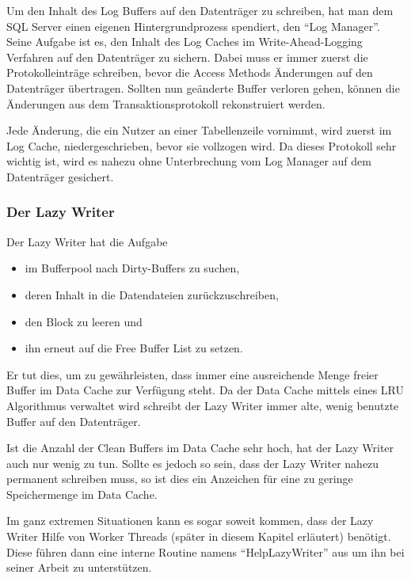           Um den Inhalt des Log Buffers auf den Datenträger zu schreiben, hat
          man dem SQL Server einen eigenen Hintergrundprozess spendiert, den
          \enquote{Log Manager}. Seine Aufgabe ist es, den Inhalt des Log Caches
          im Write-Ahead-Logging Verfahren auf den Datenträger zu sichern.
          Dabei muss er  immer zuerst die Protokolleinträge schreiben, bevor
          die Access Methods Änderungen auf den Datenträger übertragen.
          Sollten nun geänderte Buffer verloren gehen, können die Änderungen aus
          dem Transaktionsprotokoll rekonstruiert werden.
          \begin{merke}
            Jede Änderung, die ein Nutzer an einer Tabellenzeile vornimmt, wird
            zuerst im Log Cache, niedergeschrieben, bevor sie vollzogen wird. Da
            dieses Protokoll sehr wichtig ist, wird es nahezu ohne Unterbrechung
            vom Log Manager auf dem Datenträger gesichert.
          \end{merke}             
        \subsubsection{Der Lazy Writer}
          Der Lazy Writer hat die Aufgabe
          \begin{itemize}
              \item im Bufferpool nach Dirty-Buffers zu suchen,
              \item deren Inhalt in die Datendateien zurückzuschreiben,
              \item den Block zu leeren und
              \item ihn erneut auf die Free Buffer List zu setzen.
          \end{itemize}
          Er tut dies, um zu gewährleisten, dass immer eine ausreichende Menge
          freier Buffer im Data Cache zur Verfügung steht. Da der Data Cache
          mittels eines LRU Algorithmus verwaltet wird schreibt der Lazy Writer
          immer alte, wenig benutzte Buffer auf den Datenträger.
          
          Ist die Anzahl der Clean Buffers im Data Cache sehr hoch, hat der Lazy
          Writer auch nur wenig zu tun. Sollte es jedoch so sein, dass der Lazy
          Writer nahezu permanent schreiben muss, so ist dies ein Anzeichen für
          eine zu geringe Speichermenge im Data Cache.
          
          Im ganz extremen Situationen kann es sogar soweit kommen, dass der Lazy
          Writer Hilfe von Worker Threads (später in diesem Kapitel erläutert)
          benötigt. Diese führen dann eine interne Routine namens
          \enquote{HelpLazyWriter} aus um ihn bei seiner Arbeit zu
          unterstützen.

